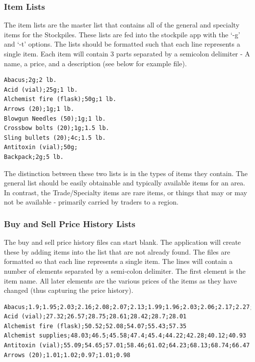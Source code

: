\subsubsection{Item Lists}

The item lists are the master list that contains all of the general and specialty items for the Stockpiles. These lists are fed into the stockpile app with the `-g' and `-t' options. The lists should be formatted such that each line represents a single item. Each item will contain 3 parts separated by a semicolon delimiter - A name, a price, and a description (see below for example file). 

\begin{lstlisting}
Abacus;2g;2 lb.
Acid (vial);25g;1 lb.
Alchemist fire (flask);50g;1 lb.
Arrows (20);1g;1 lb.
Blowgun Needles (50);1g;1 lb.
Crossbow bolts (20);1g;1.5 lb.
Sling bullets (20);4c;1.5 lb.
Antitoxin (vial);50g;
Backpack;2g;5 lb.
\end{lstlisting}

The distinction between these two lists is in the types of items they contain. The general list should be easily obtainable and typically available items for an area. In contrast, the Trade/Specialty items are rare items, or things that may or may not be available - primarily carried by traders to a region.

\subsubsection{Buy and Sell Price History Lists \label{stockpile:buy and sell}}

The buy and sell price history files can start blank. The application will create these by adding items into the list that are not already found. The files are formatted so that each line represents a single item. The lines will contain a number of elements separated by a semi-colon delimiter. The first element is the item name. All later elements are the various prices of the items as they have changed (thus capturing the price history).

\begin{lstlisting}
Abacus;1.9;1.95;2.03;2.16;2.08;2.07;2.13;1.99;1.96;2.03;2.06;2.17;2.27;2.31
Acid (vial);27.32;26.57;28.75;28.61;28.42;28.7;28.01
Alchemist fire (flask);50.52;52.08;54.07;55.43;57.35
Alchemist supplies;48.03;46.5;45.58;47.4;45.4;44.22;42.28;40.12;40.93
Antitoxin (vial);55.09;54.65;57.01;58.46;61.02;64.23;68.13;68.74;66.47
Arrows (20);1.01;1.02;0.97;1.01;0.98
\end{lstlisting}

